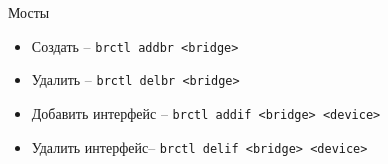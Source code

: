 \begin{frame}{Мосты}
	\begin{itemize}
		\item Создать -- {\tt brctl addbr <bridge>}
		\item Удалить -- {\tt brctl delbr <bridge>}
		\item Добавить интерфейс -- {\tt brctl addif <bridge> <device>}
		\item Удалить интерфейс-- {\tt brctl delif <bridge> <device>}
	\end{itemize}
\end{frame}


